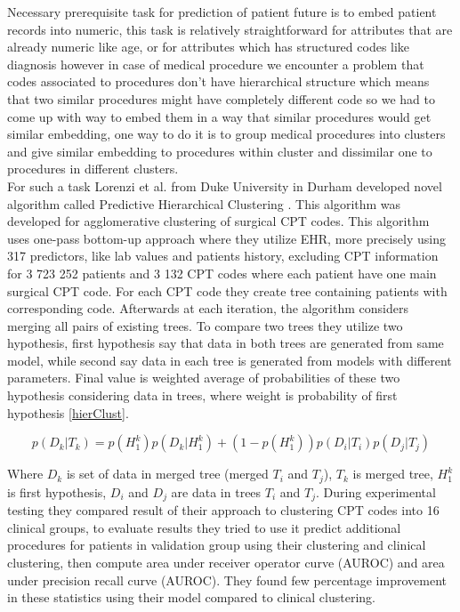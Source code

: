 
Necessary prerequisite task for prediction of patient future is to embed patient records into numeric, this task is relatively straightforward for attributes that are already numeric like age, or for attributes which has structured codes like diagnosis however in case of medical procedure we encounter a problem that codes associated to procedures don't have hierarchical structure which means that two similar procedures might have completely different code so we had to come up with way to embed them in a way that similar procedures would get similar embedding, one way to do it is to group medical procedures into clusters and give similar embedding to procedures within cluster and dissimilar one to procedures in different clusters.
\\

For such a task Lorenzi et al. from Duke University in Durham developed novel algorithm called Predictive Hierarchical Clustering \cite{lorenzi2017predictive}. This algorithm was developed for agglomerative clustering of surgical CPT codes. This algorithm uses one-pass bottom-up approach where they utilize EHR, more precisely using 317 predictors, like lab values and patients history, excluding CPT information for 3 723 252 patients and 3 132 CPT codes where each patient have one main surgical CPT code. For each CPT code they create tree containing patients with corresponding code. Afterwards at each iteration, the algorithm considers merging all pairs of existing trees. To compare two trees they utilize two hypothesis, first hypothesis say that data in both trees are generated from same model, while second say data in each tree is generated from models with different parameters. Final value is weighted average of probabilities of these two hypothesis considering data in trees, where weight is probability of first hypothesis \ref{hierClust}.

\begin{equation}
	\label{hierClust}
	p(D_k \vert T_k) = p(H_1^k)p(D_k \vert H_1^k) + (1 - p(H_1^k))p(D_i \vert T_i)p(D_j \vert T_j)
\end{equation} 

Where $D_k$ is set of data in merged tree (merged $T_i$ and $T_j$), $T_k$ is merged tree, $H_1^k$ is first hypothesis, $D_i$ and $D_j$ are data in trees $T_i$ and $T_j$. During experimental testing they compared result of their approach to clustering CPT codes into 16 clinical groups, to evaluate results they tried to use it predict additional procedures for patients in validation group using their clustering and clinical clustering, then compute area under  receiver operator curve (AUROC) and area under precision recall curve (AUROC). They found few percentage improvement in these statistics using their model compared to clinical clustering.
\\

